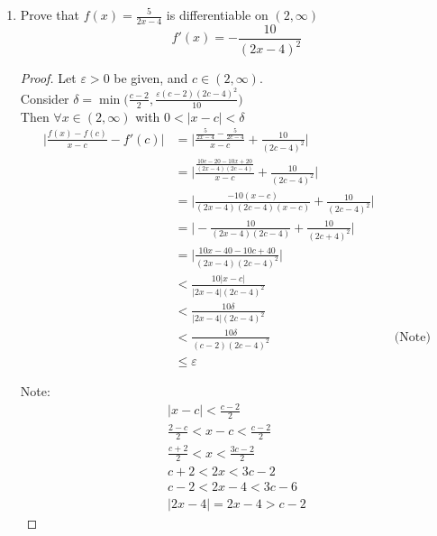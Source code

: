 \documentclass[12pt]{article}
\begin{document}
\begin{enumerate}
\begin{proof}
        Note:
        \begin{gather*}
            |x-c| < \frac{c-0}{2} \\
            -\frac{c}{2} < x-c < \frac{c}{2} \\
            \frac{c}{2} < x < \frac{3c}{2} \\
            3c < 6x < 9c \\
            3c+1 < 6x+1 < 9c+1 \\
            |6x+1| = 6x+1 > 3c+1
        \end{gather*}
    \end{proof}

    \item Prove that $f(x) = \frac{5}{2x-4}$ is differentiable on $(2, \infty)$
    \[f'(x) = -\frac{10}{{(2x-4)}^2} \]
    \begin{proof}
        Let $\varepsilon > 0$ be given, and $c \in (2, \infty)$. \\
        Consider $\delta = \min \Big( \frac{c-2}{2}, \frac{\varepsilon(c-2){(2c-4)}^2}{10} \Big)$ \\
        Then $\forall x \in (2, \infty)$ with $0 < |x-c| < \delta$
        \begin{align*}
            \bigg| \frac{f(x) - f(c)}{x-c} - f'(c) \bigg| &= \Bigg| \frac{\frac{5}{2x-4}-\frac{5}{2c-4}}{x-c} + \frac{10}{{(2c-4)}^2} \Bigg| \\
            &= \Bigg| \frac{\frac{10c-20-10x+20}{(2x-4)(2c-4)}}{x-c} + \frac{10}{{(2c-4)}^2} \Bigg| \\
            &= \bigg| \frac{-10(x-c)}{(2x-4)(2c-4)(x-c)} + \frac{10}{{(2c-4)}^2} \bigg| \\
            &= \bigg| -\frac{10}{(2x-4)(2c-4)} + \frac{10}{{(2c+4)}^2} \bigg| \\
            &= \bigg| \frac{10x-40 - 10c+40}{(2x-4){(2c-4)}^2} \bigg| \\
            &< \frac{10|x-c|}{|2x-4|{(2c-4)}^2} \\
            &< \frac{10\delta}{|2x-4|{(2c-4)}^2} \\
            &< \frac{10\delta}{(c-2){(2c-4)}^2} && \text{(Note)}\\
            &\leq \varepsilon
        \end{align*}

        Note:
        \begin{gather*}
            |x-c| < \frac{c-2}{2} \\
            \frac{2-c}{2} < x-c < \frac{c-2}{2} \\
            \frac{c+2}{2} < x < \frac{3c-2}{2} \\
            c+2 < 2x < 3c-2 \\
            c-2 < 2x-4 < 3c-6 \\
            |2x-4| = 2x-4 > c-2
        \end{gather*}
    \end{proof}


\end{enumerate}
\end{document}
